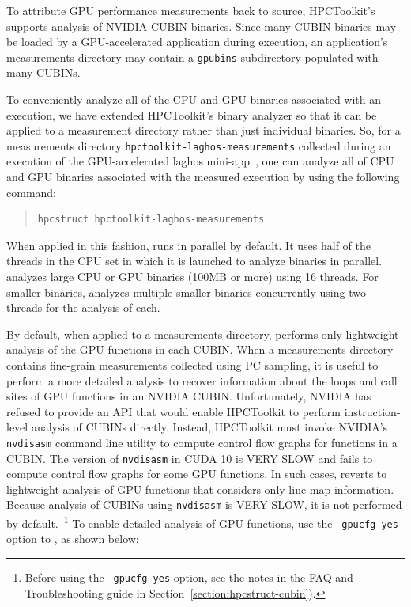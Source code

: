 To  attribute GPU performance measurements back to source, HPCToolkit's \hpcstruct{} supports analysis of NVIDIA CUBIN binaries. Since many CUBIN binaries may be loaded  by a GPU-accelerated application during execution, an application's measurements directory may contain a {\tt gpubins} subdirectory populated with many CUBINs.

To conveniently analyze all of the CPU and GPU binaries associated with an execution,
we have extended HPCToolkit's \hpcstruct{} binary analyzer so that it can be applied to a measurement directory rather than just individual binaries. So, for a measurements directory {\tt hpctoolkit-laghos-measurements} collected during an execution of the GPU-accelerated laghos mini-app~\cite{laghos}, one can analyze all of CPU and GPU binaries associated with the measured execution by using the following command:

\begin{quote}
\begin{verbatim}
hpcstruct hpctoolkit-laghos-measurements
\end{verbatim}
\end{quote}

When applied in this fashion, \hpcstruct{} runs in parallel by default. It uses half of the threads in the CPU set in which it is launched to analyze binaries in parallel. \hpcstruct{}  analyzes large CPU or GPU binaries (100MB or more) using 16 threads. For smaller binaries,  \hpcstruct{} analyzes multiple smaller binaries concurrently using two threads for the analysis of each.

By default, when applied to a measurements directory, \hpcstruct{} performs only lightweight analysis of the GPU functions in each CUBIN. When a measurements directory contains fine-grain measurements collected using PC sampling, it is useful to perform a more detailed analysis to recover information about the loops and call sites of GPU functions in an NVIDIA CUBIN. Unfortunately, NVIDIA has refused to provide an API that would enable HPCToolkit to perform instruction-level analysis of CUBINs directly. Instead, HPCToolkit must invoke NVIDIA's {\tt nvdisasm} command line utility to compute control flow graphs for functions in a CUBIN. The version of {\tt nvdisasm} in CUDA 10 is VERY SLOW and fails to compute control flow graphs for some GPU functions. In such cases, \hpcstruct{} reverts to lightweight analysis of GPU functions that considers only line map information. Because analysis of CUBINs using {\tt nvdisasm} is VERY SLOW, it is not performed by default.~\footnote{Before using the {\tt --gpucfg yes} option, see the notes in the FAQ and Troubleshooting guide in Section~\ref{section:hpcstruct-cubin}).}  To enable detailed analysis of GPU functions, use the {\tt --gpucfg yes} option to \hpcstruct{}, as shown below:

